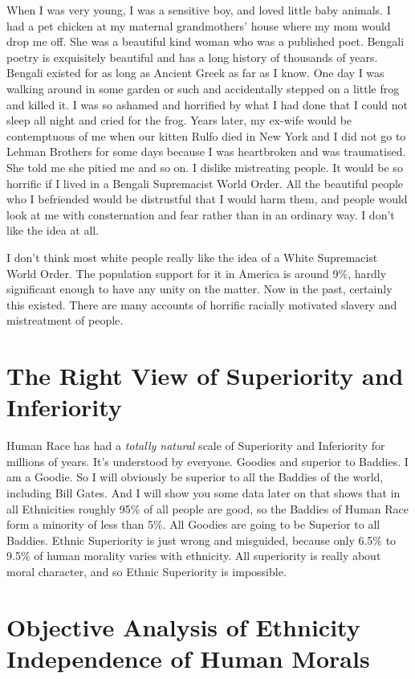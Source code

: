 \documentclass{amsart}
\begin{document}
When I was very young, I was a sensitive boy, and loved little baby animals.  I had a pet chicken at my maternal grandmothers' house where my mom would drop me off.  She was a beautiful kind woman who was a published poet.  Bengali poetry is exquisitely beautiful and has a long history of thousands of years.  Bengali existed for as long as Ancient Greek as far as I know.  One day I was walking around in some garden or such and accidentally stepped on a little frog and killed it.  I was so ashamed and horrified by what I had done that I could not sleep all night and cried for the frog.  Years later, my ex-wife would be contemptuous of me when our kitten Rulfo died in New York and I did not go to Lehman Brothers for some days because I was heartbroken and was traumatised.  She told me she pitied me and so on.  I dislike mistreating people.  It would be so horrific if I lived in a Bengali Supremacist World Order.  All the beautiful people who I befriended would be distrustful that I would harm them, and people would look at me with consternation and fear rather than in an ordinary way.  I don't like the idea at all.  

I don't think most white people really like the idea of a White Supremacist World Order.  The population support for it in America is around 9\%, hardly significant enough to have any unity on the matter.  Now in the past, certainly this existed.  There are many accounts of horrific racially motivated slavery and mistreatment of people.

\section{The Right View of Superiority and Inferiority}

Human Race has had a {\em totally natural} scale of Superiority and Inferiority for millions of years.  It's understood by everyone.  Goodies and superior to Baddies.  I am a Goodie.  So I will obviously be superior to all the Baddies of the world, including Bill Gates. And I will show you some data later on that shows that in all Ethnicities roughly 95\% of all people are good, so the Baddies of Human Race form a minority of less than 5\%.  All Goodies are going to be Superior to all Baddies.  Ethnic Superiority is just wrong and misguided, because only 6.5\% to 9.5\% of human morality varies with ethnicity.  All superiority is really about moral character, and so Ethnic Superiority is impossible.

\section{Objective Analysis of Ethnicity Independence of Human Morals}
\end{document}
